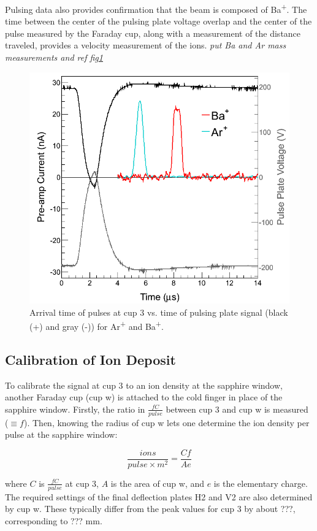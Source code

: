 Pulsing data also provides confirmation that the beam is composed of Ba\textsuperscript{+}.  The time between the center of the pulsing plate voltage overlap and the center of the pulse measured by the Faraday cup, along with a measurement of the distance traveled, provides a velocity measurement of the ions.  \emph{\color{red}put Ba and Ar mass measurements and ref fig\ref{fig:pulses_ArBa}}

\begin{figure}[h]
        \centering
                \includegraphics[width=.7\textwidth]{figures/pulses_BaAr.png}
                \caption{Arrival time of pulses at cup 3 vs. time of pulsing plate signal (black (+) and gray (-)) for Ar\textsuperscript{+} and Ba\textsuperscript{+}.}
\label{fig:pulses_ArBa}
\end{figure}

\subsection{Calibration of Ion Deposit}
\label{subsec:ionDepCal}

To calibrate the signal at cup 3 to an ion density at the sapphire window, another Faraday cup (cup w) is attached to the cold finger in place of the sapphire window.  Firstly, the ratio in $\frac{fC}{pulse}$ between cup 3 and cup w is measured ($\equiv f$).  Then, knowing the radius of cup w lets one determine the ion density per pulse at the sapphire window:

\begin{equation}
\frac{ions}{pulse \times m^{2}} = \frac{C f}{A e}
\label{eqn:ion_density}
\end{equation}

\noindent
where $C$ is $\frac{fC}{pulse}$ at cup 3, $A$ is the area of cup w, and $e$ is the elementary charge.  The required settings of the final deflection plates H2 and V2 are also determined by cup w.  These typically differ from the peak values for cup 3 by about ???, corresponding to ??? mm.

